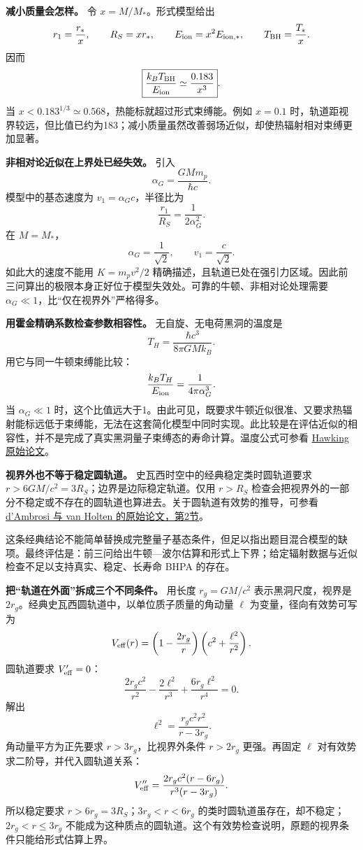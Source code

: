 \documentclass[12pt,a4paper,UTF8]{ctexart}
\begin{document}
\textbf{减小质量会怎样。} 令 \(x=M/M_*\)。形式模型给出 \[
r_1=\frac{r_*}{x},\qquad
R_S=xr_*,\qquad
E_{\rm ion}=x^2E_{\rm ion,*},\qquad
T_{\rm BH}=\frac{T_*}{x}.
\] 因而 \[
\boxed{\frac{k_BT_{\rm BH}}{E_{\rm ion}}
\simeq\frac{0.183}{x^3}}.
\] 当 \(x<0.183^{1/3}\simeq0.568\)，热能标就超过形式束缚能。例如
\(x=0.1\)
时，轨道距视界较远，但比值已约为183；减小质量虽然改善弱场近似，却使热辐射相对束缚更加显著。

\textbf{非相对论近似在上界处已经失效。} 引入 \[
\alpha_G=\frac{GMm_p}{\hbar c}.
\] 模型中的基态速度为 \(v_1=\alpha_Gc\)，半径比为 \[
\frac{r_1}{R_S}=\frac{1}{2\alpha_G^2}.
\] 在 \(M=M_*\)， \[
\alpha_G=\frac1{\sqrt2},\qquad v_1=\frac c{\sqrt2}.
\] 如此大的速度不能用 \(K=m_pv^2/2\)
精确描述，且轨道已处在强引力区域。因此前三问算出的极限本身正好位于模型失效处。可靠的牛顿、非相对论处理需要
\(\alpha_G\ll1\)，比``仅在视界外''严格得多。

\textbf{用霍金精确系数检查参数相容性。} 无自旋、无电荷黑洞的温度是 \[
T_H=\frac{\hbar c^3}{8\pi G M k_B}.
\] 用它与同一牛顿束缚能比较： \[
\frac{k_BT_H}{E_{\rm ion}}
=\frac{1}{4\pi\alpha_G^3}.
\] 当 \(\alpha_G\ll1\)
时，这个比值远大于1。由此可见，既要求牛顿近似很准、又要求热辐射能标远低于束缚能，无法在这套简化模型中同时实现。此比较是在评估近似的相容性，并不是完成了真实黑洞量子束缚态的寿命计算。温度公式可参看
\href{https://astrofrelat.fcaglp.unlp.edu.ar/agujeros_negros/media/Papers/Hawking_1975-Particle_creation_by_black_holes.pdf}{Hawking
原始论文}。

\textbf{视界外也不等于稳定圆轨道。} 史瓦西时空中的经典稳定类时圆轨道要求
\(r>6GM/c^2=3R_S\)；边界是边际稳定轨道。仅用 \(r>R_S\)
检查会把视界外的一部分不稳定或不存在的圆轨道也算进去。关于圆轨道有效势的推导，可参看
\href{https://arxiv.org/pdf/1406.4282}{d'Ambrosi 与 van Holten
的原始论文，第2节}。

这条经典结论不能简单替换成完整量子基态条件，但足以指出题目混合模型的缺项。最终评估是：前三问给出牛顿---波尔估算和形式上下界；给定辐射数据与近似检查不足以支持真实、稳定、长寿命
BHPA 的存在。

\textbf{把``轨道在外面''拆成三个不同条件。} 用长度 \(r_g=GM/c^2\)
表示黑洞尺度，视界是
\(2r_g\)。经典史瓦西圆轨道中，以单位质子质量的角动量 \(\ell\)
为变量，径向有效势可写为 \[
V_{\rm eff}(r)=
\left(1-\frac{2r_g}{r}\right)
\left(c^2+\frac{\ell^2}{r^2}\right).
\] 圆轨道要求 \(V_{\rm eff}'=0\)： \[
\frac{2r_gc^2}{r^2}
-\frac{2\ell^2}{r^3}
+\frac{6r_g\ell^2}{r^4}=0.
\] 解出 \[
\boxed{\ell^2=\frac{r_gc^2r^2}{r-3r_g}}.
\] 角动量平方为正先要求 \(r>3r_g\)，比视界外条件 \(r>2r_g\) 更强。再固定
\(\ell\) 对有效势求二阶导，并代入圆轨道关系： \[
V_{\rm eff}''=
\frac{2r_gc^2(r-6r_g)}
{r^3(r-3r_g)}.
\] 所以稳定要求 \(r>6r_g=3R_S\)；\(3r_g<r<6r_g\)
的类时圆轨道虽存在，却不稳定；\(2r_g<r\le3r_g\)
不能成为这种质点的圆轨道。这个有效势检查说明，原题的视界条件只能给形式估算上界。
\end{document}
